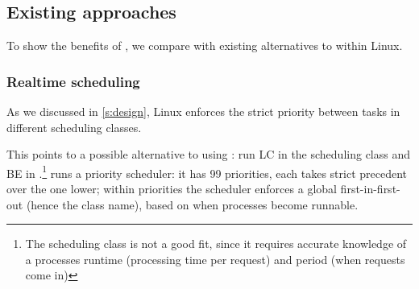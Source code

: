 \subsection{Existing approaches}\label{ss:eval:existing}

To show the benefits of \schedbe{}, we compare with existing alternatives to
\cgroups{} within Linux.

\subsubsection{Realtime scheduling}

As we discussed in \autoref{s:design}, Linux enforces the strict priority
between tasks in different scheduling classes. 

This points to a possible alternative to using \cgroups{}: run LC in the
\fifoclass{} scheduling class and BE in \normalclass{}.\footnote{The
\deadlineclass{} scheduling class is not a good fit, since it requires accurate
knowledge of a processes runtime (processing time per request) and period (when
requests come in)} \fifoclass{} runs a priority scheduler: it has 99 priorities,
each takes strict precedent over the one lower; within priorities the scheduler
enforces a global first-in-first-out (hence the \fifoclass{} class name), based
on when processes become runnable.

